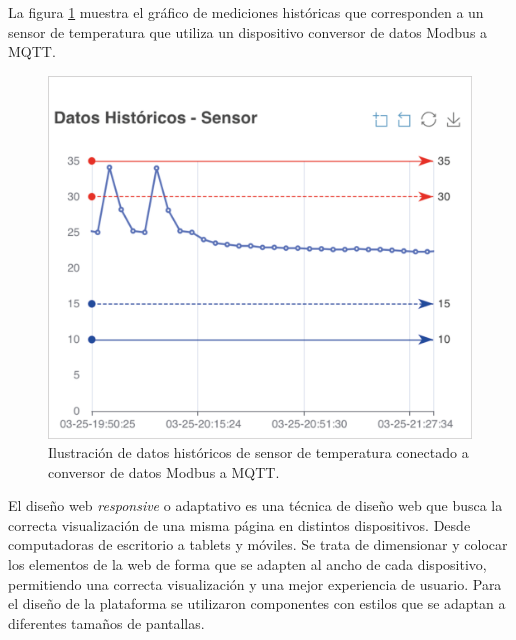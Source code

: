 \newpage

La figura \ref{fig:device-grafica} muestra el gráfico de mediciones históricas que corresponden a un sensor de temperatura que utiliza un dispositivo conversor de datos Modbus a MQTT.


\begin{figure}[htpb]
	\centering
	\includegraphics[scale=.65]{./Figures/device-grafica.png}
	\caption[Componente gráfico de echarts]{Ilustración de datos históricos de sensor de temperatura conectado a conversor de datos Modbus a MQTT.}
	\label{fig:device-grafica}
\end{figure}


El diseño web \textit{responsive} o adaptativo es una técnica de diseño web que busca la correcta visualización de una misma página en distintos dispositivos. Desde computadoras de escritorio a tablets y móviles.  Se trata de dimensionar y colocar los elementos de la web de forma que se adapten al ancho de cada dispositivo, permitiendo una correcta visualización y una mejor experiencia de usuario.  Para el diseño de la plataforma se utilizaron componentes con estilos que se adaptan a diferentes tamaños de pantallas. 



